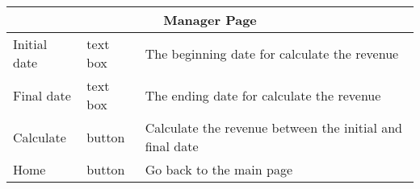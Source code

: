 \documentclass{article}
\begin{document}
\begin{center}
\begin{longtable}{| l | l | p{7cm} |}
	\hline \hline
	\multicolumn{3}{|c|}{\textbf{Manager Page}} \\
	\hline	\hline
	Initial date	& text box		& The beginning date for calculate the revenue \\
	Final date		& text box		& The ending date for calculate the revenue \\
	Calculate		& button		& Calculate the revenue between the initial and final date \\
	Home			& button		& Go back to the main page \\
	\hline
	\end{longtable}
\end{center}
\end{document}

